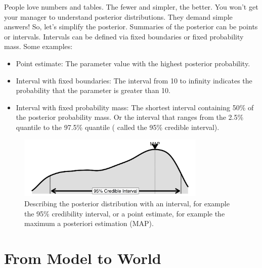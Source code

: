 \documentclass[
  10pt,
]{scrbook}
\providecommand{\tightlist}{%
  \setlength{\itemsep}{0pt}\setlength{\parskip}{0pt}}
\begin{document}
People love numbers and tables.
The fewer and simpler, the better.
You won't get your manager to understand posterior distributions.
They demand simple answers!
So, let's simplify the posterior.
Summaries of the posterior can be points or intervals.
Intervals can be defined via fixed boundaries or fixed probability mass.
Some examples:

\begin{itemize}
\tightlist
\item
  Point estimate: The parameter value with the highest posterior probability.
\item
  Interval with fixed boundaries: The interval from 10 to infinity indicates the probability that the parameter is greater than 10.
\item
  Interval with fixed probability mass: The shortest interval containing 50\% of the posterior probability mass. Or the interval that ranges from the 2.5\% quantile to the 97.5\% quantile ( called the 95\% credible interval).
\end{itemize}

\begin{figure}

{\centering \includegraphics[width=0.8\textwidth]{figures/posterior-1} 

}

\caption{Describing the posterior distribution with an interval, for example the 95\% credibility interval, or a point estimate, for example the maximum a posteriori estimation (MAP).}\label{fig:posterior}
\end{figure}

\hypertarget{from-model-to-world}{%
\section{From Model to World}\label{from-model-to-world}}
\end{document}
